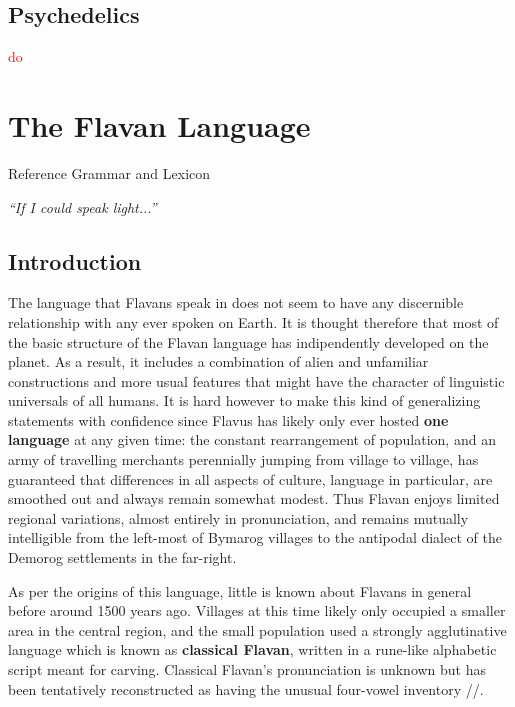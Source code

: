 \documentclass[10pt,oneside]{memoir}
\newcommand{\cmmnt}[1]{\textcolor{red}{#1}}
\newcommand{\flav}[1]{  
    \rotatebox[origin=c]{270}{
		\begin{varwidth}{10 cm}
			{\centering \flavan  #1}
		\end{varwidth}
    }
    }
\newcommand{\ipa}[1]{/\textipa{#1}/}
\begin{document}
\pagebreak

\section{Psychedelics}

\cmmnt{do}


\chapter{The Flavan Language}
{\Large Reference Grammar and Lexicon}

\vfill
\vspace{-30pt}
\begin{center}
    {\fontsize{100}{80}\selectfont \flav{n ongok keb}} 

    \emph{``If I could speak light...''}
\end{center}
\vfill

\pagebreak

\section{Introduction}

The language that Flavans speak in does not seem to have any discernible relationship with any ever spoken on Earth. It is thought therefore that most of the basic structure of the Flavan language has indipendently developed on the planet. As a result, it includes a combination of alien and unfamiliar constructions and more usual features that might have the character of linguistic universals of all humans. It is hard however to make this kind of generalizing statements with confidence since Flavus has likely only ever hosted \textbf{one language} at any given time: the constant rearrangement of population, and an army of travelling merchants perennially jumping from village to village, has guaranteed that differences in all aspects of culture, language in particular, are smoothed out and always remain somewhat modest. Thus Flavan enjoys limited regional variations, almost entirely in pronunciation, and remains mutually intelligible from the left-most of Bymarog villages to the antipodal dialect of the Demorog settlements in the far-right.

As per the origins of this language, little is known about Flavans in general before around 1500 years ago. Villages at this time likely only occupied a smaller area in the central region, and the small population used a strongly agglutinative language which is known as \textbf{classical Flavan}, written in a rune-like alphabetic script meant for carving. Classical Flavan's pronunciation is unknown but has been tentatively reconstructed as having the unusual four-vowel inventory \ipa{a e o 1}.
\end{document}
